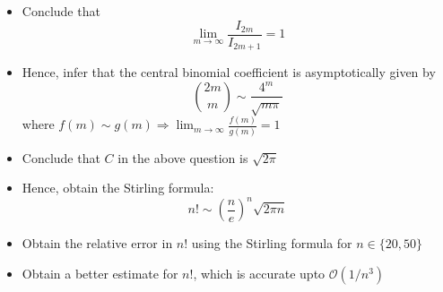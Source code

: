 \documentclass{article}
\begin{document}
\begin{enumerate}
\begin{itemize}
    \item Conclude that
        \begin{equation*}
            \lim_{m \to \infty} \frac{I_{2m}}{I_{2m + 1}} = 1
        \end{equation*}

    \item Hence, infer that the central binomial coefficient is asymptotically given by
        \begin{equation*}
            \binom{2m}{m} \sim \frac{4^{m}}{\sqrt{m\pi}}
        \end{equation*}
        where $f(m) \sim g(m) \Longrightarrow \lim_{m \to \infty} \displaystyle
        \frac{f(m)}{g(m)} = 1$

    \item Conclude that $C$ in the above question is $\sqrt{2\pi}$

    \item Hence, obtain the Stirling formula:
        \begin{equation*}
            n! \sim \left(\frac{n}{e}\right)^{n} \sqrt{2\pi n}
        \end{equation*}

    \item Obtain the relative error in $n!$ using the Stirling formula for $n \in \{20,50\}$

    \item Obtain a better estimate for $n!$, which is accurate upto $\mathcal{O}(1/n^{3})$
\end{itemize}

\end{enumerate}
\end{document}
